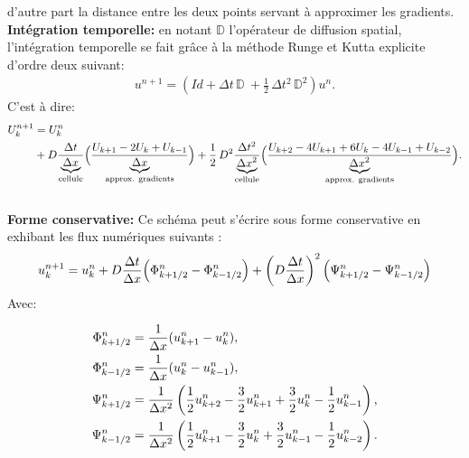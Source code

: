             d'autre part la distance entre les deux points servant à approximer les gradients.\\
            \textbf{Intégration temporelle: } en notant $\mathbb{D}$ l'opérateur de diffusion spatial, l'intégration temporelle se fait grâce à la méthode Runge et Kutta explicite d'ordre deux suivant: 
            \begin{align}
                u^{n+1} = \left(Id+ \Delta t\, \mathbb{D} \ + \frac{1}{2} \, \Delta t^2 \, \mathbb{D}^2 \right) u^n.
            \end{align}
            C'est à dire:
            \begin{align}
                U_k^{n+1} &= U_k^n\\ \notag
                &+ D \frac{\Delta t}{\underbrace{\Delta x}_{\text{cellule}}} \Bigl(\frac{U_{k+1} - 2 U_{k} + U_{k-1}}{\underbrace{\Delta x}_{\text{approx. gradients}}}\Bigr)%
                +\frac{1}{2} \,D^2 \frac{\Delta t^2}{\underbrace{\Delta x^2}_{\text{cellule}}} \Bigl(\frac{U_{k+2} -4 U_{k+1}  +6 U_{k} -4 U_{k-1} + U_{k-2}}{\underbrace{\Delta x^2}_{\text{approx. gradients}}}\Bigr).
            \end{align}\\
            \textbf{Forme conservative: }
            Ce schéma peut s'écrire sous forme conservative en exhibant les flux numériques suivants :
            \begin{align}
                u^{n+1}_k = u^n_k +  D \frac{\Delta t}{\Delta x} \Bigl( \Phi^n_{k+1/2} - \Phi^n_{k-1/2} \Bigr)  + \left( D \frac{\Delta t}{\Delta x} \right)^2 \Bigl( \Psi^n_{k+1/2} - \Psi^n_{k-1/2} \Bigr) 
            \end{align}
            Avec:

            \begin{align}
                \Phi^n_{k+1/2} &= \frac{1}{\Delta x}(u^n_{k+1} - u^n_{k}),\\
                \Phi^n_{k-1/2} &= \frac{1}{\Delta x}(u^n_{k} - u^n_{k-1}),\\\notag
                \Psi^n_{k+1/2} &= \frac{1}{\Delta x^2} \left(\frac{1}{2} u^n_{k+2} -  \frac{3}{2}  u^n_{k+1} +  \frac{3}{2} u^n_{k} -  \frac{1}{2} u^n_{k-1}\right),\\\notag
                \Psi^n_{k-1/2} &= \frac{1}{\Delta x^2} \left(\frac{1}{2} u^n_{k+1} -  \frac{3}{2}  u^n_{k}   +  \frac{3}{2}u^n_{k-1} -  \frac{1}{2}u^n_{k-2}\right).\notag
            \end{align}
\newpage

